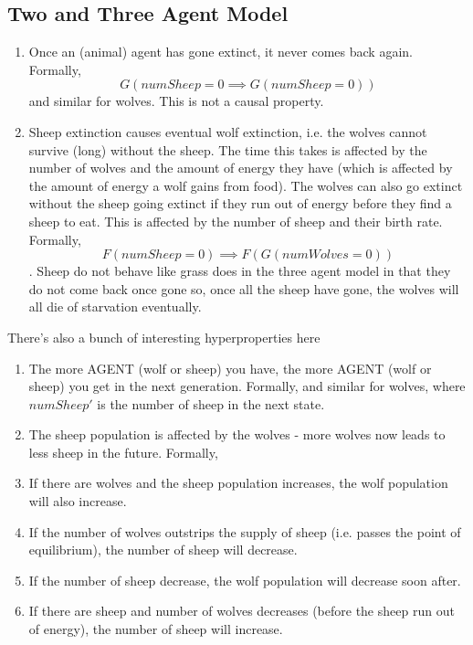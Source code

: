 \documentclass{article}
\begin{document}
\subsection{Two and Three Agent Model}
\begin{enumerate}
  \item Once an (animal) agent has gone extinct, it never comes back again.
        Formally,
        $$G(numSheep = 0 \implies G(numSheep = 0))$$
        and similar for wolves.
        This is not a causal property.
  \item Sheep extinction causes eventual wolf extinction, i.e. the wolves cannot survive (long) without the sheep. The time this takes is affected by the number of wolves and the amount of energy they have (which is affected by the amount of energy a wolf gains from food). The wolves can also go extinct without the sheep going extinct if they run out of energy before they find a sheep to eat. This is affected by the number of sheep and their birth rate.
        Formally,
        $$F(numSheep = 0) \implies F(G(numWolves = 0))$$.
        Sheep do not behave like grass does in the three agent model in that they do not come back once gone so, once all the sheep have gone, the wolves will all die of starvation eventually.
\end{enumerate}
There's also a bunch of interesting hyperproperties here
\begin{enumerate}
  \item The more AGENT (wolf or sheep) you have, the more AGENT (wolf or sheep) you get in the next generation.
        Formally,
        and similar for wolves, where $numSheep'$ is the number of sheep in the next state.
  \item The sheep population is affected by the wolves - more wolves now leads to less sheep in the future.
        Formally,
  \item If there are wolves and the sheep population increases, the wolf population will also increase.
  \item If the number of wolves outstrips the supply of sheep (i.e. passes the point of equilibrium), the number of sheep will decrease.
  \item If the number of sheep decrease, the wolf population will decrease soon after.
  \item If there are sheep and number of wolves decreases (before the sheep run out of energy), the number of sheep will increase.
\end{enumerate}
\end{document}
